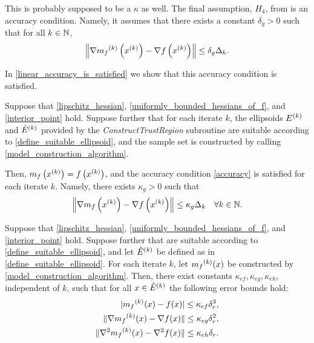 \documentclass{article}
\begin{document}
\color{magenta}
This is probably supposed to be a $\kappa$ as well.
\color{black}
The final assumption, $H_4$,  from \cite{Conejo:2013:GCT:2620806.2621814} is an accuracy condition.
Namely, it assumes that there exists a constant $\delta_g > 0$ such that for all $k \in \mathbb N$,
\begin{equation}
\label{accuracy}
\left\| \nabla {{m}_f}^{(k)}\left(x^{(k)}\right) - \nabla f\left(x^{(k)}\right) \right\| \le \delta_g \Delta_k.
\end{equation}

In \cref{linear_accuracy_is_satisfied} we show that this accuracy condition is satisfied.


\begin{theorem}
\label{linear_accuracy_is_satisfied}

Suppose that \cref{lipschitz_hessian}, \cref{uniformly_bounded_hessians_of_f}, and \cref{interior_point} hold.
Suppose further that for each iterate $k$, the ellipsoids ${E^{(k)}}$ and ${{\hat E}^{(k)}}$ provided by the \emph{ConstructTrustRegion} subroutine 
are suitable according to \cref{define_suitable_ellipsoid},
and the sample set is constructed by calling \cref{model_construction_algorithm}.


Then, $m_f\left(x^{(k)}\right) = f\left(x^{(k)}\right)$, and
the accuracy condition \cref{accuracy} is satisfied for each iterate $k$.
Namely, there exists $\kappa_{g} > 0$ such that 
\begin{align*}
\left\|\nabla m_f\left(x^{(k)}\right) - \nabla f\left(x^{(k)}\right)\right\| \le \kappa_g \Delta_k \quad \forall k \in \mathbb N.
\end{align*}
\end{theorem}


\begin{theorem}
\label{linear_accuracy_is_satisfied}

Suppose that \cref{lipschitz_hessian}, \cref{uniformly_bounded_hessians_of_f}, and \cref{interior_point} hold.  
Suppose further that 
are suitable according to \cref{define_suitable_ellipsoid}, and let ${{\hat E}^{(k)}}$ be defined as in \cref{define_suitable_ellipsoid}.    For each iterate $k$, let ${{m}_f}^{(k)}(x)$ be constructed by \cref{model_construction_algorithm}.    
Then,  there exist constants $\kappa_{ef}, \kappa_{eg}, \kappa_{eh}$, independent of $k$,  such that for all $x \in {{\hat E}^{(k)}}$ the following error bounds hold:
 \begin{align*}
|{{m}_f}^{(k)}(x) - f(x)| \le \kappa_{ef} \delta_r^3, \\
\|\nabla {{m}_f}^{(k)}(x) - \nabla  f(x)\| \le \kappa_{eg}\delta_r^2,  \\
\|\nabla^2 {{m}_f}^{(k)}(x) - \nabla^2  f(x)\| \le \kappa_{eh}\delta_r. 
\end{align*}


\end{theorem}
\end{document}

